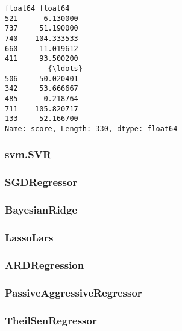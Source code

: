 \documentclass[11pt]{article}
\begin{document}
    \begin{Verbatim}[commandchars=\\\{\}]
float64 float64
521      6.130000
737     51.190000
740    104.333533
660     11.019612
411     93.500200
          {\ldots}
506     50.020401
342     53.666667
485      0.218764
711    105.820717
133     52.166700
Name: score, Length: 330, dtype: float64
    \end{Verbatim}

    \subsubsection{svm.SVR}\label{svm.svr}

    \subsubsection{SGDRegressor}\label{sgdregressor}

    \subsubsection{BayesianRidge}\label{bayesianridge}

    \subsubsection{LassoLars}\label{lassolars}

    \subsubsection{ARDRegression}\label{ardregression}

    \subsubsection{PassiveAggressiveRegressor}\label{passiveaggressiveregressor}

    \subsubsection{TheilSenRegressor}\label{theilsenregressor}
\end{document}

